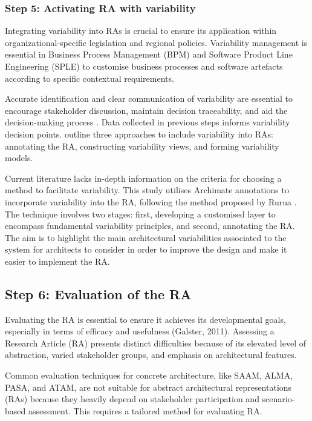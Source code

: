 \documentclass[journal]{IEEEtran}
\begin{document}
\subsubsection{Step 5: Activating RA with variability}

Integrating variability into RAs is crucial to ensure its application within organizational-specific legislation and regional policies. Variability management is essential in Business Process Management (BPM) and Software Product Line Engineering (SPLE) to customise business processes and software artefacts according to specific contextual requirements.

Accurate identification and clear communication of variability are essential to encourage stakeholder discussion, maintain decision traceability, and aid the decision-making process \cite{czarnecki2012cool}. Data collected in previous steps informs variability decision points. \cite{GALSTER2011Empirically} outline three approaches to include variability into RAs: annotating the RA, constructing variability views, and forming variability models.

Current literature lacks in-depth information on the criteria for choosing a method to facilitate variability. This study utilises Archimate annotations to incorporate variability into the RA, following the method proposed by Rurua \cite{rurua2019representing}. The technique involves two stages: first, developing a customised layer to encompass fundamental variability principles, and second, annotating the RA. The aim is to highlight the main architectural variabilities associated to the system for architects to consider in order to improve the design and make it easier to implement the RA.

\subsection{Step 6: Evaluation of the RA}

Evaluating the RA is essential to ensure it achieves its developmental goals, especially in terms of efficacy and usefulness (Galster, 2011). Assessing a Research Article (RA) presents distinct difficulties because of its elevated level of abstraction, varied stakeholder groups, and emphasis on architectural features.

Common evaluation techniques for concrete architecture, like SAAM, ALMA, PASA, and ATAM, are not suitable for abstract architectural representations (RAs) because they heavily depend on stakeholder participation and scenario-based assessment. This requires a tailored method for evaluating RA.
\end{document}
